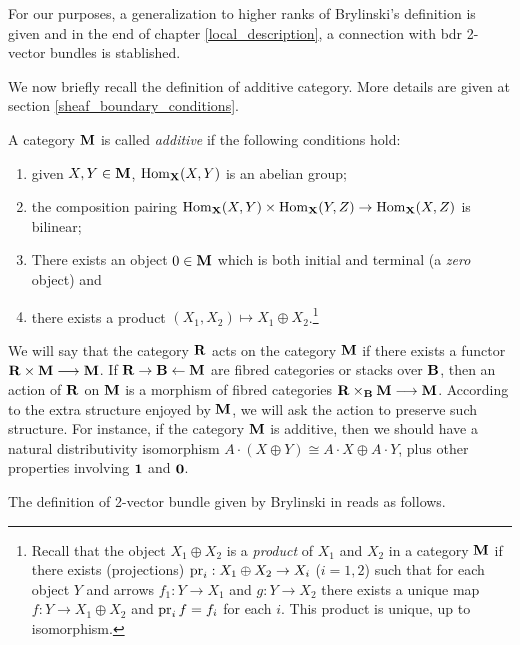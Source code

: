 For our purposes, a generalization to higher ranks of Brylinski's definition is given and in the end of chapter \ref{local_description}, a connection with {\sc bdr} 2-vector bundles is stablished.

We now briefly recall the definition of additive category. More details are given at section \ref{sheaf_boundary_conditions}.

\begin{defi}
A category ${\bf M}$ is called \emph{additive} if the following conditions hold:
\begin{enumerate}
\item given $X,Y\in {\bf M}$, $\operatorname{Hom}_{\bf X}(X,Y)$ is an abelian group;
\item the composition pairing $\operatorname{Hom}_{\bf X}(X,Y)\times \operatorname{Hom}_{\bf X}(Y,Z)\to \operatorname{Hom}_{\bf X}(X,Z)$ is bilinear;
\item There exists an object $0\in {\bf M}$ which is both initial and terminal (a \emph{zero} object) and
\item there exists a product $(X_1,X_2)\mapsto X_1\oplus X_2$.\footnote{Recall that the object $X_1\oplus X_2$ is a \emph{product} of $X_1$ and $X_2$ in a category ${\bf M}$ if there exists (projections) $\operatorname{pr}_i:X_1\oplus X_2\to X_i$ ($i=1,2$) such that for each object $Y$ and arrows $f_1:Y\to X_1$ and $g:Y\to X_2$ there exists a unique map $f:Y\to X_1\oplus X_2$ and $\operatorname{pr}_if=f_i$ for each $i$. This product is unique, up to isomorphism.}
\end{enumerate}
\end{defi}

We will say that the category ${\bf R}$ acts on the category ${\bf M}$ if there exists a functor ${\bf R}\times {\bf M}\longrightarrow {\bf M}$. If ${\bf R}\to{\bf B}\leftarrow {\bf M}$ are fibred categories or stacks over ${\bf B}$, then an action of ${\bf R}$ on ${\bf M}$ is a morphism of fibred categories ${\bf R}\times_{{\bf B}}{\bf M}\longrightarrow {\bf M}$. According to the extra structure enjoyed by ${\bf M}$, we will ask the action to preserve such structure. For instance, if the category ${\bf M}$ is additive, then we should have a natural distributivity isomorphism $A\cdot (X\oplus Y)\cong A\cdot X\oplus A\cdot Y$, plus other properties involving ${\bf 1}$ and ${\bf 0}$.

The definition of 2-vector bundle given by Brylinski in \cite{brylinski:_catvb} reads as follows.

